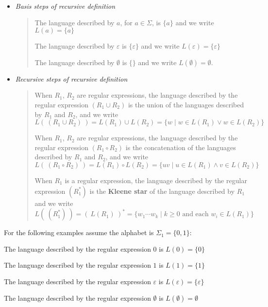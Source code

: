 \documentclass[12pt, oneside]{article}
\begin{document}
\begin{itemize}
    \item[] {\it Basis steps of recursive definition}
    \begin{quote}    
        The language described by $a$, for $a \in \Sigma$, is $\{a\}$ and we write 
        $L(a) = \{a\}$
    
        The language described by $\varepsilon$ is $\{\varepsilon\}$ and we write 
        $L(\varepsilon) = \{ \varepsilon\}$
    
        The language described by $\emptyset$ is $\{\}$ and we write
        $L(\emptyset) = \emptyset$.
    \end{quote}
    
    \item[] {\it Recursive steps of recursive definition}
    \begin{quote}
        When $R_1$, $R_2$ are regular expressions, the language described by the regular
        expression $(R_1 \cup R_2)$ is the union of the languages described by $R_1$ and $R_2$, 
        and we write 
        $$L(~(R_1 \cup R_2)~) = L(R_1) \cup L(R_2) = \{ w \mid w \in L(R_1) \lor w \in L(R_2)\}$$
    
        When $R_1$, $R_2$ are regular expressions, the language described by the regular
        expression $(R_1 \circ R_2)$ is the concatenation of the languages described by $R_1$ and $R_2$, 
        and we write 
        $$L(~(R_1 \circ R_2)~) = L(R_1) \circ L(R_2) = \{ uv \mid u \in L(R_1) \land v \in L(R_2)\}$$
    
        When $R_1$ is a regular expression, the language described by the regular 
        expression $(R_1^*)$ is the {\bf Kleene star} of the language described by $R_1$ and we write
        $$L(~(R_1^*)~) = (~L(R_1)~)^* = \{ w_1 \cdots w_k \mid k \geq 0 \textrm{ and each } w_i \in L(R_1)\}$$
    \end{quote}
\end{itemize}
  
For the following examples assume the alphabet is $\Sigma_1 =  \{0,1\}$:
    
The language described by the regular expression $0$ is $L(0) = \{ 0 \}$

The language described by the regular expression $1$ is $L(1)  = \{ 1 \}$

The language described by the regular expression $\varepsilon$ is $L(\varepsilon) = \{ \varepsilon  \}$

The language described by the regular expression $\emptyset$ is $L(\emptyset) = \emptyset$
\end{document}

